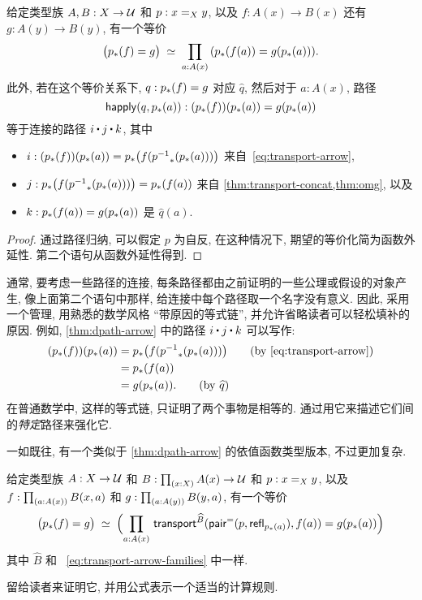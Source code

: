 \begin{lem}\label{thm:dpath-arrow}
  给定类型族 $A,B:X\to\type$ 和 $p:\id[X]xy$, 以及 $f:A(x)\to B(x)$ 还有 $g:A(y)\to B(y)$, 有一个等价
  \[ \eqvspaced{ \big(\trans{p}{f} = {g}\big) } { \prd{a:A(x)}  (\trans{p}{f(a)} = g(\trans{p}{a})) }. \]
  此外, 若在这个等价关系下, $q:\trans{p}{f} = {g}$ 对应 $\widehat q$, 然后对于 $a:A(x)$, 路径
  \[ \happly(q,\trans p a) : (\trans p f)(\trans p a) = g(\trans p a)\]
  等于连接的路径 $i\ct j\ct k$, 其中
  \begin{itemize}
  \item $i:(\trans p f)(\trans p a) = \trans p {f (\trans {\opp p}{\trans p a})}$ 来自~\eqref{eq:transport-arrow},
  \item $j:\trans p {f (\trans {\opp p}{\trans p a})} = \trans p {f(a)}$ 来自 \cref{thm:transport-concat,thm:omg}, 以及
  \item $k:\trans p {f(a)}= g(\trans p a)$ 是 $\widehat{q}(a)$.
  \end{itemize}
\end{lem}
\begin{proof}
  通过路径归纳, 可以假定 $p$ 为自反, 在这种情况下, 期望的等价化简为函数外延性.
  第二个语句从函数外延性得到.
\end{proof}

通常, 要考虑一些路径的连接, 每条路径都由之前证明的一些公理或假设的对象产生, 像上面第二个语句中那样, 给连接中每个路径取一个名字没有意义.
因此, 采用一个管理, 用熟悉的数学风格 ``带原因的等式链'', 并允许省略读者可以轻松填补的原因.
例如, \cref{thm:dpath-arrow} 中的路径 $i\ct j\ct k$ 可以写作:
  \begin{align*}
    (\trans p f)(\trans p a)
    &= \trans p {f (\trans {\opp p}{\trans p a})}
    \tag{by~\eqref{eq:transport-arrow}}\\
    &= \trans p {f(a)}\\
    &= g(\trans p a).
    \tag{by $\widehat{q}$}
  \end{align*}
在普通数学中, 这样的等式链, 只证明了两个事物是相等的.
通过用它来描述它们间的\emph{特定}路径来强化它.

一如既往, 有一个类似于 \cref{thm:dpath-arrow} 的依值函数类型版本, 不过更加复杂.

\begin{lem}\label{thm:dpath-forall}
  给定类型族 $A:X\to\type$ 和 $B:\prd{x:X} A(x)\to\type$ 和 $p:\id[X]xy$, 以及 $f:\prd{a:A(x)} B(x,a)$ 和 $g:\prd{a:A(y)} B(y,a)$, 有一个等价
  \[ \eqvspaced{ \big(\trans{p}{f} = {g}\big) } { \Parens{\prd{a:A(x)}  \transfib{\widehat{B}}{\pairpath(p,\refl{\trans pa})}{f(a)} = g(\trans{p}{a}) } } \]
  其中 $\widehat{B}$ 和 ~\eqref{eq:transport-arrow-families} 中一样.
\end{lem}

留给读者来证明它, 并用公式表示一个适当的计算规则.

%
%
%